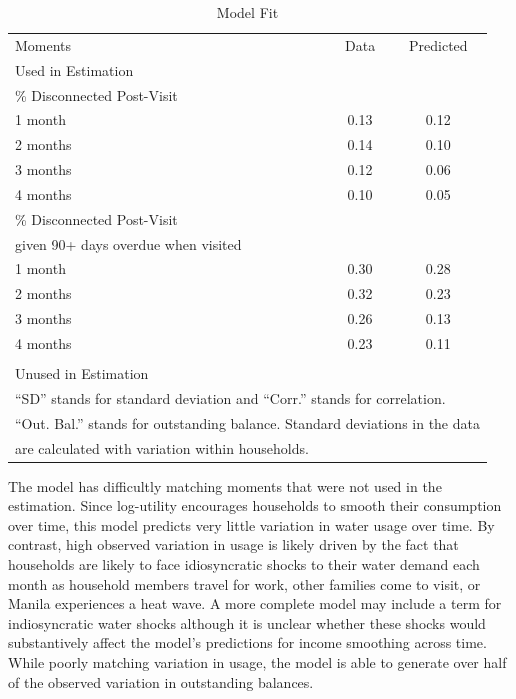 \documentclass[12pt]{article}
\begin{document}
\begin{table}[H]
\centering
\caption{Model Fit}\label{table:fit}

\begin{tabular}{l*{1}{cc}}
\toprule
 Moments & Data  & Predicted \\[.5em]
Used in Estimation & & \\
\midrule
[.5em]
\% Disconnected Post-Visit  & & \\[.2em]
1 month &0.13&0.12\\
2 months &0.14&0.10\\
3 months  &0.12&0.06\\
4 months &0.10&0.05\\[.8em]
\% Disconnected Post-Visit & & \\
given 90+ days overdue when visited & & \\[.2em]
1 month &0.30&0.28\\
2 months &0.32&0.23\\
3 months &0.26&0.13\\
4 months &0.23&0.11\\
& & \\
Unused in Estimation & & \\
\midrule

\bottomrule
\multicolumn{3}{l}{\scriptsize ``SD'' stands for standard deviation and ``Corr.'' stands for correlation. }  \\[-.5em]
\multicolumn{3}{l}{\scriptsize ``Out. Bal.'' stands for outstanding balance. Standard deviations in the data }  \\[-.5em]
\multicolumn{3}{l}{\scriptsize are calculated with variation within households.}
\end{tabular}
%
\end{table}

The model has difficultly matching moments that were not used in the estimation.  Since log-utility encourages households to smooth their consumption over time, this model predicts very little variation in water usage over time.  By contrast, high observed variation in usage is likely driven by the fact that households are likely to face idiosyncratic shocks to their water demand each month as household members travel for work, other families come to visit, or Manila experiences a heat wave.  A more complete model may include a term for indiosyncratic water shocks although it is unclear whether these shocks would substantively affect the model's predictions for income smoothing across time.  While poorly matching variation in usage, the model is able to generate over half of the observed variation in outstanding balances.  
\end{document}

